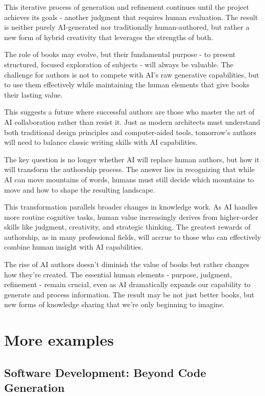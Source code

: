 \documentclass[
  Letterpaper,
]{scrbook}
\begin{document}
This iterative process of generation and refinement continues until the
project achieves its goals - another judgment that requires human
evaluation. The result is neither purely AI-generated nor traditionally
human-authored, but rather a new form of hybrid creativity that
leverages the strengths of both.

The role of books may evolve, but their fundamental purpose - to present
structured, focused exploration of subjects - will always be valuable.
The challenge for authors is not to compete with AI's raw generative
capabilities, but to use them effectively while maintaining the human
elements that give books their lasting value.

This suggests a future where successful authors are those who master the
art of AI collaboration rather than resist it. Just as modern architects
must understand both traditional design principles and computer-aided
tools, tomorrow's authors will need to balance classic writing skills
with AI capabilities.

The key question is no longer whether AI will replace human authors, but
how it will transform the authorship process. The answer lies in
recognizing that while AI can move mountains of words, humans must still
decide which mountains to move and how to shape the resulting landscape.

This transformation parallels broader changes in knowledge work. As AI
handles more routine cognitive tasks, human value increasingly derives
from higher-order skills like judgment, creativity, and strategic
thinking. The greatest rewards of authorship, as in many professional
fields, will accrue to those who can effectively combine human insight
with AI capabilities.

The rise of AI authors doesn't diminish the value of books but rather
changes how they're created. The essential human elements - purpose,
judgment, refinement - remain crucial, even as AI dramatically expands
our capability to generate and process information. The result may be
not just better books, but new forms of knowledge sharing that we're
only beginning to imagine.

\section{More examples}\label{more-examples}

\subsection{Software Development: Beyond Code
Generation}\label{software-development-beyond-code-generation}
\end{document}
